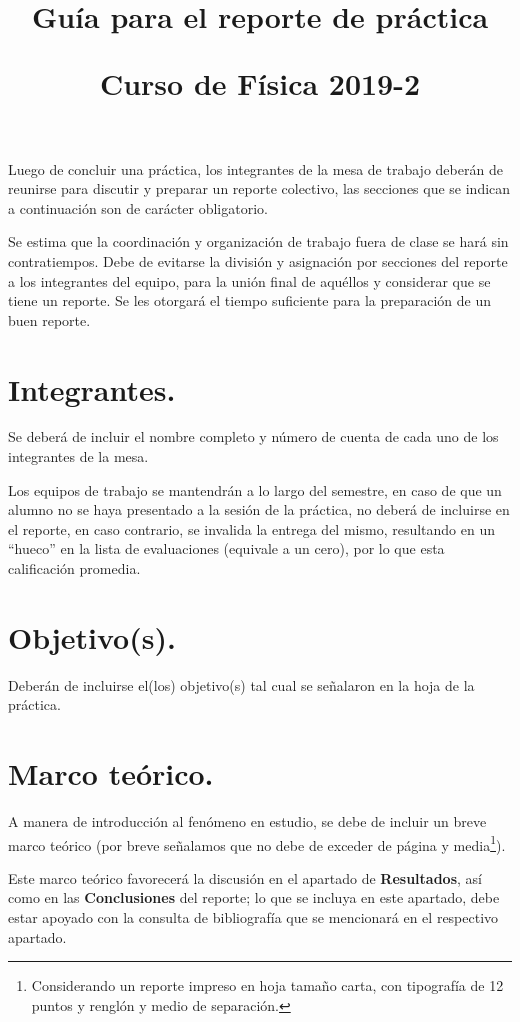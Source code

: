 
\usepackage[sfdefault]{roboto}  %
\usepackage[T1]{fontenc}
\title{Guía para el reporte de práctica \\ \begin{Large}Curso de Física 2019-2\end{Large}}
\setlength{\voffset}{-1cm}

\maketitle
\vspace*{-2cm} 
\fontsize{14}{14}\selectfont
Luego de concluir una práctica, los integrantes de la mesa de trabajo deberán de reunirse para discutir y preparar un reporte colectivo, las secciones que se indican a continuación son de carácter obligatorio.
\par
Se estima que la coordinación y organización de trabajo fuera de clase se hará sin contratiempos. Debe de evitarse la división y asignación por secciones del reporte a los integrantes del equipo, para la unión final de aquéllos y considerar que se tiene un reporte. Se les otorgará el tiempo suficiente para la preparación de un buen reporte.
\section{Integrantes.}
Se deberá de incluir el nombre completo y número de cuenta de cada uno de los integrantes de la mesa.
\par
Los equipos de trabajo se mantendrán a lo largo del semestre, en caso de que un alumno no se haya presentado a la sesión de la práctica, no deberá de incluirse en el reporte, en caso contrario, se invalida la entrega del mismo, resultando en un \enquote{hueco} en la lista de evaluaciones (equivale a un cero), por lo que esta calificación promedia.
\section{Objetivo(s).}
Deberán de incluirse el(los) objetivo(s) tal cual se señalaron en la hoja de la práctica.
\section{Marco teórico.}
A manera de introducción al fenómeno en estudio, se debe de incluir un breve marco teórico (por breve señalamos que no debe de exceder de página y media\footnote{Considerando un reporte impreso en hoja tamaño carta, con tipografía de 12 puntos y renglón y medio de separación.}).
\par
Este marco teórico favorecerá la discusión en el apartado de \textbf{Resultados}, así como en las \textbf{Conclusiones} del reporte; lo que se incluya en este apartado, debe estar apoyado con la consulta de bibliografía que se mencionará en el respectivo apartado.

